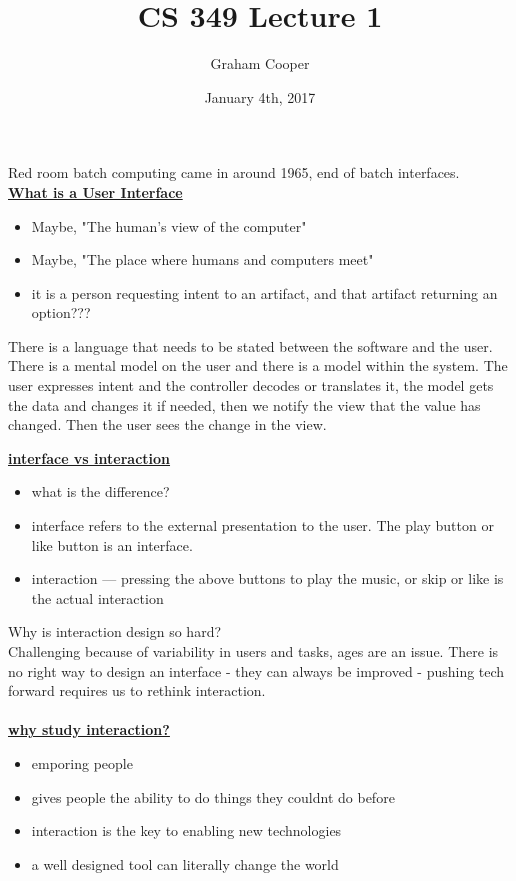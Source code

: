 \documentclass[12pt]{article}
\title{\vspace{-15ex}CS 349 Lecture 1\vspace{-1ex}}
\date{January 4th, 2017}
\author{Graham Cooper}
\newcommand{\myt}[1]{\textbf{\underline{#1}}}
\begin{document}
	\maketitle
	
	Red room batch computing came in around 1965, end of batch interfaces. \\
	
	\myt{What is a User Interface}
	\begin{itemize}
		\item Maybe, "The human's view of the computer"
		\item Maybe, "The place where humans and computers meet"
		\item it is a person requesting intent to an artifact, and that artifact returning an option???
	\end{itemize}

	There is a language that needs to be stated between the software and the user. There is a mental model on the user and there is a model within the system. The user expresses intent and the controller decodes or translates it, the model gets the data and changes it if needed, then we notify the view that the value has changed. Then the user sees the change in the view.
	
	\myt{interface vs interaction}
	\begin{itemize}
		\item what is the difference?
		\item interface refers to the external presentation to the user. The play button or like button is an interface.
		\item interaction --- pressing the above buttons to play the music, or skip or like is the actual interaction
	\end{itemize}

	Why is interaction design so hard?\\
	Challenging because of variability in users and tasks, ages are an issue. There is no right way to design an interface - they can always be improved - pushing tech forward requires us to rethink interaction.\\\\
	
	\myt{why study interaction?}
	\begin{itemize}
		\item emporing people
		\item gives people the ability to do things they couldnt do before
		\item interaction is the key to enabling new technologies
		\item a well designed tool can literally change the world
	\end{itemize}
	
	
\end{document}
